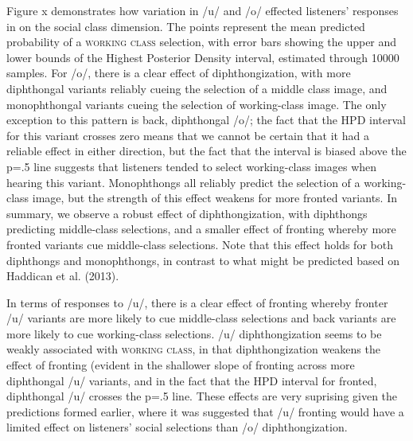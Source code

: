 \documentclass[PWPL]{article}
\begin{document}
Figure x demonstrates how variation in /u/ and /o/ effected listeners' responses in on the social class dimension. The points represent the mean predicted probability of a \textsc{working class} selection, with error bars showing the upper and lower bounds of the Highest Posterior Density interval, estimated through 10000 samples. For /o/, there is a clear effect of diphthongization, with more diphthongal variants reliably cueing the selection of a middle class image, and monophthongal variants cueing the selection of working-class image. The only exception to this pattern is back, diphthongal /o/; the fact that the HPD interval for this variant crosses zero means that we cannot be certain that it had a reliable effect in either direction, but the fact that the interval is biased above the p=.5 line suggests that listeners tended to select working-class images when hearing this variant. Monophthongs all reliably predict the selection of a working-class image, but the strength of this effect weakens for more fronted variants. In summary, we observe a robust effect of diphthongization, with diphthongs predicting middle-class selections, and a smaller effect of fronting whereby more fronted variants cue middle-class selections. Note that this effect holds for both diphthongs and monophthongs, in contrast to what might be predicted based on Haddican et al. (2013). 

In terms of responses to /u/, there is a clear effect of fronting whereby fronter /u/ variants are more likely to cue middle-class selections and back variants are more likely to cue working-class selections. /u/ diphthongization seems to be weakly associated with \textsc{working class}, in that diphthongization weakens the effect of fronting (evident in the shallower slope of fronting across more diphthongal /u/ variants, and in the fact that the HPD interval for fronted, diphthongal /u/ crosses the p=.5 line. These effects are very suprising given the predictions formed earlier, where it was suggested that /u/ fronting would have a limited effect on listeners' social selections than /o/ diphthongization. 
\end{document}
